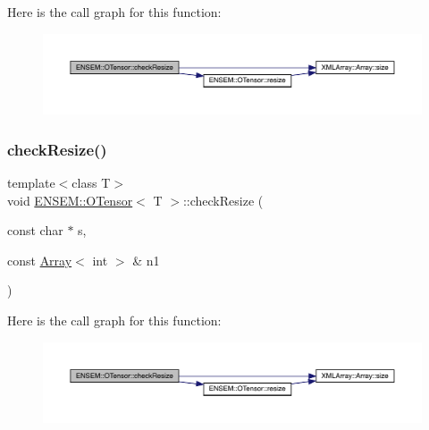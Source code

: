 Here is the call graph for this function\+:
\nopagebreak
\begin{figure}[H]
\begin{center}
\leavevmode
\includegraphics[width=350pt]{da/d8a/classENSEM_1_1OTensor_aa273eae7f1de4b37e91302da5edf279b_cgraph}
\end{center}
\end{figure}
\mbox{\label{classENSEM_1_1OTensor_aa273eae7f1de4b37e91302da5edf279b}} 
\subsubsection{\texorpdfstring{checkResize()}{checkResize()}\hspace{0.1cm}{\footnotesize\ttfamily [3/6]}}
{\footnotesize\ttfamily template$<$class T$>$ \\
void \mbox{\hyperlink{classENSEM_1_1OTensor}{E\+N\+S\+E\+M\+::\+O\+Tensor}}$<$ T $>$\+::check\+Resize (\begin{DoxyParamCaption}\item[{const char $\ast$}]{s,  }\item[{const \mbox{\hyperlink{classXMLArray_1_1Array}{Array}}$<$ int $>$ \&}]{n1 }\end{DoxyParamCaption})\hspace{0.3cm}{\ttfamily [inline]}}

Here is the call graph for this function\+:
\nopagebreak
\begin{figure}[H]
\begin{center}
\leavevmode
\includegraphics[width=350pt]{da/d8a/classENSEM_1_1OTensor_aa273eae7f1de4b37e91302da5edf279b_cgraph}
\end{center}
\end{figure}
\mbox{\label{classENSEM_1_1OTensor_a0f656f8ef2b19a258a8c86a4e80ea902}} 
